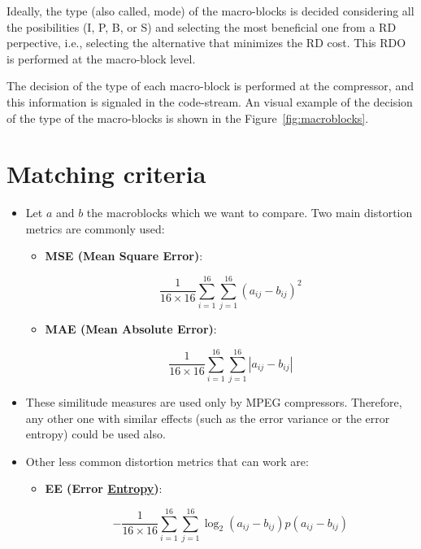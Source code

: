 Ideally, the type (also called, mode) of the macro-blocks is decided
considering all the posibilities (I, P, B, or S) and selecting the
most beneficial one from a RD perpective, i.e., selecting the
alternative that minimizes the RD cost. This RDO is performed at the
macro-block level.

The decision of the type of each macro-block is performed at the
compressor, and this information is signaled in the code-stream. An
visual example of the decision of the type of the macro-blocks is
shown in the Figure~\ref{fig:macroblocks}.

\section{Matching criteria}
\begin{itemize}
\item
  Let $a$ and $b$ the macroblocks which we want to compare. Two main
  distortion metrics are commonly used:

  \begin{itemize}
  \item
    \textbf{MSE (Mean Square Error)}:

    \begin{equation}
      \frac{1}{16\times 16}\sum_{i=1}^{16}\sum_{j=1}^{16}(a_{ij}-b_{ij})^2
    \end{equation}
  \item
    \textbf{MAE (Mean Absolute Error)}:

    \begin{equation}
      \frac{1}{16\times 16}\sum_{i=1}^{16}\sum_{j=1}^{16}|a_{ij}-b_{ij}|
    \end{equation}
  \end{itemize}
\item
  These similitude measures are used only by MPEG compressors.
  Therefore, any other one with similar effects (such as the error
  variance or the error entropy) could be used also.
\item
  Other less common distortion metrics that can work are:

  \begin{itemize}
  \item
    \textbf{EE (Error
    \href{https://en.wikipedia.org/wiki/Entropy_(information_theory)}{Entropy})}:

    \begin{equation}
      -\frac{1}{16\times 16}\sum_{i=1}^{16}\sum_{j=1}^{16}\log_2(a_{ij}-b_{ij})p(a_{ij}-b_{ij})
    \end{equation}
  \end{itemize}
\end{itemize}

